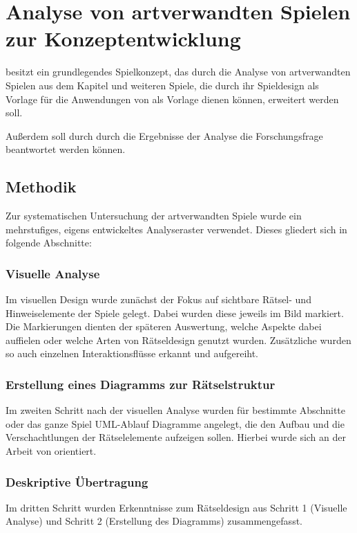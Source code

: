 \chapter{Analyse von artverwandten Spielen zur Konzeptentwicklung}
 besitzt ein grundlegendes Spielkonzept, das durch die Analyse von artverwandten Spielen aus dem Kapitel \emph{} und weiteren Spiele, die durch ihr Spieldesign als Vorlage für die Anwendungen von  als Vorlage dienen können, erweitert werden soll.

Außerdem soll durch durch die Ergebnisse der Analyse die Forschungsfrage \emph{} beantwortet werden können.

\section{Methodik}
Zur systematischen Untersuchung der artverwandten Spiele wurde ein mehrstufiges, eigens entwickeltes Analyseraster verwendet. Dieses gliedert sich in folgende Abschnitte:

\subsection{Visuelle Analyse}
Im visuellen Design wurde zunächst der Fokus auf sichtbare Rätsel- und Hinweiselemente der Spiele gelegt. Dabei wurden diese jeweils im Bild markiert. Die Markierungen dienten der späteren Auswertung, welche Aspekte dabei auffielen oder welche Arten von Rätseldesign genutzt wurden. Zusätzliche wurden so auch einzelnen Interaktionsflüsse erkannt und aufgereiht.

\subsection{Erstellung eines Diagramms zur Rätselstruktur}
Im zweiten Schritt nach der visuellen Analyse wurden für bestimmte Abschnitte oder das ganze Spiel UML-Ablauf Diagramme angelegt, die den Aufbau und die Verschachtlungen der Rätselelemente aufzeigen sollen. Hierbei wurde sich an der Arbeit von \cite{tim_schafer_grim_1996} orientiert.

\subsection{Deskriptive Übertragung}
Im dritten Schritt wurden Erkenntnisse zum Rätseldesign aus Schritt 1 (Visuelle Analyse) und Schritt 2 (Erstellung des Diagramms) zusammengefasst.

